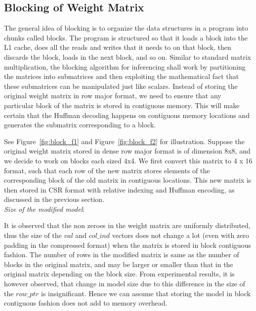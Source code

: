 \subsection{Blocking of Weight Matrix}

 The
general idea of blocking is to organize the data structures in a program into  chunks called blocks. The program is
structured so that it loads a block into the L1 cache, does all the reads and writes that it needs to on that
block, then discards the block, loads in the next block, and so on. 
Similar to standard matrix multiplication, the blocking algorithm for inferencing shall work 
 by partitioning the matrices into submatrices and then exploiting
the mathematical fact that these submatrices can be manipulated just like scalars.
Instead of storing the  original weight matrix in row major format,
we need to ensure that any particular block of the matrix is stored in contiguous memory.  
This will make certain	 that the Huffman decoding happens on contiguous memory locations and  generates the submatrix 
corresponding to a block.


See Figure~\ref{fig:block_f1} and Figure~\ref{fig:block_f2} for illustration.
Suppose the original weight matrix  stored in dense row major format is of dimension 8x8, and we decide to work on blocks each sized 4x4. 
We first convert  this matrix to   4 x 16 format, such that each row of the new matrix stores 
elements of the corresponding block of the old matrix in contiguous locations. This new matrix 
is then stored in CSR format with relative indexing and Huffman encoding, as discussed in the 
previous section. 
\\
{\it Size of the modified model}:


It is observed that the non zeroes  in the weight matrix are uniformly distributed, thus
the size of the $val$ and $col\_ind$ vectors does not change a lot  (even with zero padding in the compressed format)  when the matrix is
stored in block contiguous fashion.
The number of rows in the modified matrix is same as the number of blocks in the original matrix, and may be larger or smaller than that
in the  original matrix depending on the block size. From experimental results, it is however observed, that
change in model size due to this difference in the size of the $row\_ptr$ is insignificant. Hence we can assume that 
storing the model in block contiguous fashion does not add to memory overhead.



